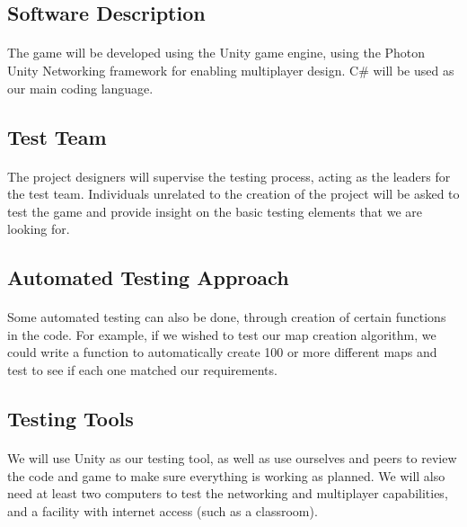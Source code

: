\documentclass[12pt, titlepage]{article}
\begin{document}
\subsection{Software Description}
\paragraph{}The game will be developed using the Unity game engine, using the Photon Unity Networking framework for enabling multiplayer design. C# will be used as our main coding language.
\subsection{Test Team}
\paragraph{}The project designers will supervise the testing process, acting as the leaders for the test team. Individuals unrelated to the creation of the project will be asked to test the game and provide insight on the basic testing elements that we are looking for. 
\subsection{Automated Testing Approach}
\paragraph{}Some automated testing can also be done, through creation of certain functions in the code. For example, if we wished to test our map creation algorithm, we could write a function to automatically create 100 or more different maps and test to see if each one matched our requirements. 
\subsection{Testing Tools}
\paragraph{}We will use Unity as our testing tool, as well as use ourselves and peers to review the code and game to make sure everything is working as planned. We will also need at least two computers to test the networking and multiplayer capabilities, and a facility with internet access (such as a classroom).
\end{document}
